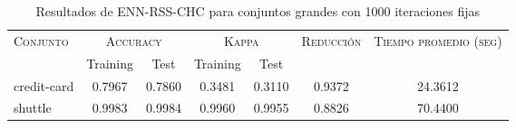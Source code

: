 \begin{table}[]
\centering
\begin{tabular}{l c c c c c c}
\hline
\multirow{2}{*}{\textsc{Conjunto}}
	& \multicolumn{2}{c}{\textsc{Accuracy}}
	& \multicolumn{2}{c}{\textsc{Kappa}}
	& \textsc{Reducción}
	& \textsc{Tiempo promedio (seg)} \\
	& Training & Test
	& Training & Test \\ 
\hline
\hline

credit-card & 0.7967 & 0.7860 & 0.3481 & 0.3110 & 0.9372 & 24.3612 \\
shuttle & 0.9983 & 0.9984 & 0.9960 & 0.9955 & 0.8826 & 70.4400 \\

\hline
\end{tabular}
\caption{Resultados de ENN-RSS-CHC para conjuntos grandes con 1000 iteraciones fijas}
\label{res-grande-ENN-RSS-CHC}
\end{table}